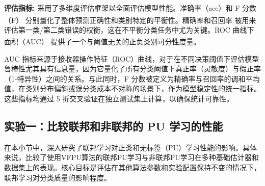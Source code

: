 \textbf{评估指标:}  
采用了多维度评估框架以全面评估模型性能。准确率（acc）和 F 分数（F）\textsuperscript{\cite{cheng2021secureboost}} 分别量化了整体预测正确性和类别特定的平衡性。精确率和召回率 \textsuperscript{\cite{liu2003building}} 被用来评估第一类/第二类错误的权衡，这在不平衡分类任务中尤为关键。ROC 曲线下面积（AUC）\textsuperscript{\cite{cheng2021secureboost}} 提供了一个与阈值无关的正负类别可分性度量。  

AUC 指标来源于接收器操作特征（ROC）曲线，对于在不同决策阈值下评估模型鲁棒性尤其具有信息量，因为它量化了所有分类阈值下真正率（灵敏度）与假正率（1-特异性）之间的关系。与此同时，F 分数被定义为精确率与召回率的调和平均值，在类别分布偏斜或误分类成本不对称的场景下，作为模型稳定性的统一指标。这些指标均通过 5 折交叉验证在独立测试集上计算，以确保统计可靠性。  
\subsection{实验一：比较联邦和非联邦的 PU 学习的性能}

在本小节中，深入研究了联邦学习对正类和无标签（PU）学习性能的影响。具体来说，比较了使用VFPU算法的联邦PU学习与非联邦PU学习在多种基础估计器和数据集上的表现。核心目标是评估在其他算法参数和实验配置保持不变的情况下，联邦学习对分类质量的影响程度。

